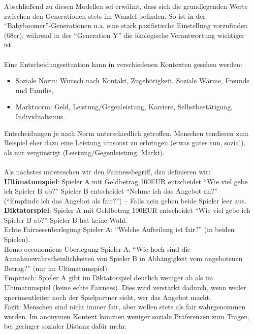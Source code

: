 Abschließend zu diesen Modellen sei erwähnt, dass sich die grundlegenden Werte zwischen den Generationen stets im Wandel befinden. So ist in der ``Babyboomer''-Generationen u.a. eine stark pazifistische Einstellung vorzufinden (68er), während in der ``Generation Y'' die ökologische Verantwortung wichtiger ist.\\
\ \\
Eine Entscheidungssituation kann in verschiedenen Kontexten gesehen werden:
\begin{itemize}
	\item Soziale Norm: Wunsch nach Kontakt, Zugehörigkeit, Soziale Wärme, Freunde und Familie,
	\item Marktnorm: Geld, Leistung/Gegenleistung, Karriere, Selbstbestätigung, Individualismus.
\end{itemize}
Entscheidungen je nach Norm unterschiedlich getroffen, Menschen tendieren zum Beispiel eher dazu eine Leistung umsonst zu erbringen (etwas gutes tun, sozial), als nur vergünstigt (Leistung/Gegenleistung, Markt).\\
\ \\
Als nächstes untersuchen wir den Fairnessbegriff, dzu definieren wir:\\
\textbf{Ultimatumspiel}: Spieler A mit Geldbetrag 100EUR entscheidet ``Wie viel gebe ich Spieler B ab?'' Spieler B entscheidet ``Nehme ich das Angebot an?''  (``Empfinde ich das Angebot als fair?'') -- Falls nein gehen beide Spieler leer aus.\\
\textbf{Diktatorspiel}: Spieler A mit Geldbetrag 100EUR entscheidet ``Wie viel gebe ich Spieler B ab?'' Spieler B hat keine Wahl.\\
Echte Fairnessüberlegung Spieler A: ``Welche Aufteilung ist fair?'' (in beiden Spielen).\\
Homo oeconomicus-Überlegung Spieler A: ``Wie hoch sind die Annahmewahrscheinlichkeiten von Spieler B in Abhängigkeit vom angebotenen Betrag?'' (nur im Ultimatumspiel)\\
Empirisch: Spieler A gibt im Diktatorspiel deutlich weniger ab als im Ultimatumspiel (keine echte Fairness). Dies wird verstärkt dadurch, wenn weder xperimentleiter noch der Spielpartner sieht, wer das Angebot macht.\\
Fazit: Menschen sind nicht immer fair, aber wollen stets als fair wahrgenommen werden. Im anonymen Kontext kommen weniger soziale Präferenzen zum Tragen, bei geringer sozialer Distanz dafür mehr.\\
\ \\
